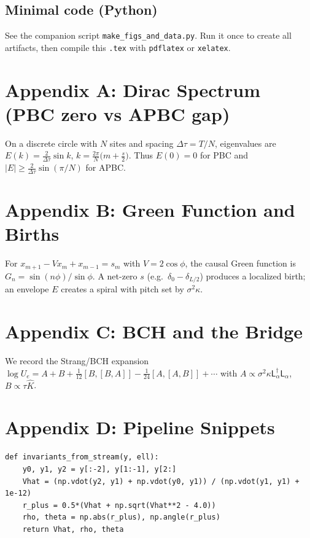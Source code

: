 \documentclass[11pt]{article}
\newcommand{\Lap}{\mathsf{L}_{\alpha}}
\begin{document}
\subsection*{Minimal code (Python)}
See the companion script \texttt{make\_figs\_and\_data.py}. Run it once to create all artifacts,
then compile this \texttt{.tex} with \texttt{pdflatex} or \texttt{xelatex}.

\appendix
\section*{Appendix A: Dirac Spectrum (PBC zero vs APBC gap)}
On a discrete circle with $N$ sites and spacing $\Delta\tau=T/N$, eigenvalues are
$E(k)=\frac{2}{\Delta\tau}\sin k$, $k=\frac{2\pi}{N}\big(m+\frac{s}{2}\big)$. Thus $E(0)=0$ for PBC
and $|E|\ge \frac{2}{\Delta\tau}\sin(\pi/N)$ for APBC.

\section*{Appendix B: Green Function and Births}
For $x_{m+1}-V x_m + x_{m-1}=s_m$ with $V=2\cos\phi$, the causal Green function is
$G_n=\sin(n\phi)/\sin\phi$. A net-zero $s$ (e.g.\ $\delta_0-\delta_{L/2}$) produces a localized birth;
an envelope $E$ creates a spiral with pitch set by $\sigma^2\kappa$.

\section*{Appendix C: BCH and the Bridge}
We record the Strang/BCH expansion $\log U_e=A+B+\frac{1}{12}[B,[B,A]]-\frac{1}{24}[A,[A,B]]+\cdots$
with $A\propto \sigma^2\kappa \Lap^\dagger\Lap$, $B\propto \tau \widehat K$.

\section*{Appendix D: Pipeline Snippets}
\begin{verbatim}
def invariants_from_stream(y, ell):
    y0, y1, y2 = y[:-2], y[1:-1], y[2:]
    Vhat = (np.vdot(y2, y1) + np.vdot(y0, y1)) / (np.vdot(y1, y1) + 1e-12)
    r_plus = 0.5*(Vhat + np.sqrt(Vhat**2 - 4.0))
    rho, theta = np.abs(r_plus), np.angle(r_plus)
    return Vhat, rho, theta
\end{verbatim}
\end{document}
